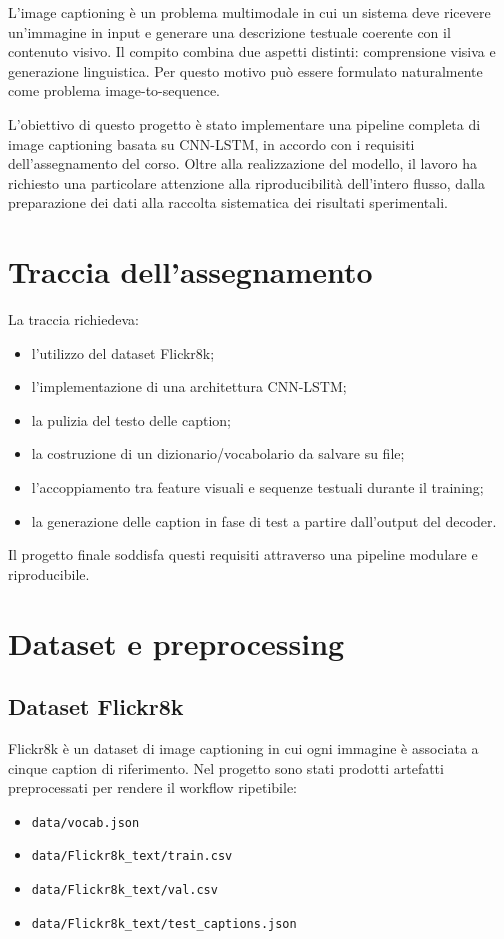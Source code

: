 \documentclass[11pt,a4paper]{article}
\begin{document}
L'image captioning è un problema multimodale in cui un sistema deve ricevere un'immagine in input e generare una descrizione testuale coerente con il contenuto visivo. Il compito combina due aspetti distinti: comprensione visiva e generazione linguistica. Per questo motivo può essere formulato naturalmente come problema image-to-sequence.

L'obiettivo di questo progetto è stato implementare una pipeline completa di image captioning basata su CNN-LSTM, in accordo con i requisiti dell'assegnamento del corso. Oltre alla realizzazione del modello, il lavoro ha richiesto una particolare attenzione alla riproducibilità dell'intero flusso, dalla preparazione dei dati alla raccolta sistematica dei risultati sperimentali.

\section{Traccia dell'assegnamento}

La traccia richiedeva:
\begin{itemize}[leftmargin=*]
    \item l'utilizzo del dataset Flickr8k;
    \item l'implementazione di una architettura CNN-LSTM;
    \item la pulizia del testo delle caption;
    \item la costruzione di un dizionario/vocabolario da salvare su file;
    \item l'accoppiamento tra feature visuali e sequenze testuali durante il training;
    \item la generazione delle caption in fase di test a partire dall'output del decoder.
\end{itemize}

Il progetto finale soddisfa questi requisiti attraverso una pipeline modulare e riproducibile.

\section{Dataset e preprocessing}

\subsection{Dataset Flickr8k}

Flickr8k è un dataset di image captioning in cui ogni immagine è associata a cinque caption di riferimento. Nel progetto sono stati prodotti artefatti preprocessati per rendere il workflow ripetibile:
\begin{itemize}[leftmargin=*]
    \item \texttt{data/vocab.json}
    \item \texttt{data/Flickr8k\_text/train.csv}
    \item \texttt{data/Flickr8k\_text/val.csv}
    \item \texttt{data/Flickr8k\_text/test\_captions.json}
\end{itemize}
\end{document}
